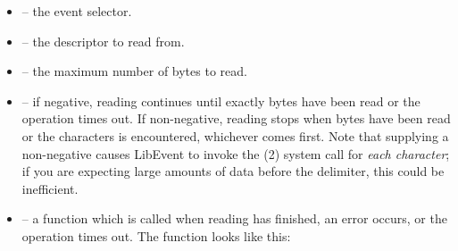 \documentclass{article}
\newcommand{\Le}{\textsf{LibEvent}}
\begin{document}
\begin{itemize}
\item {} -- the event selector.
\item {} -- the descriptor to read from.
\item {} -- the maximum number of bytes to read.
\item {} -- if negative, reading continues until exactly
   bytes have been read or the operation times out.  If
  non-negative, reading stops when  bytes have been read
  or the characters  is encountered, whichever comes first.
  Note that supplying a non-negative  causes \Le{} to
  invoke the (2) system call for \emph{each character}; if
  you are expecting large amounts of data before the delimiter, this
  could be inefficient.
\item {} -- a function which is called when reading has finished,
  an error occurs, or the operation times out.  The function 
  looks like this:

  ~


\end{itemize}
\end{document}
